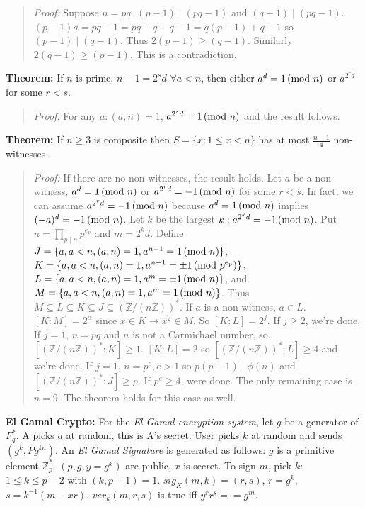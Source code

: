 \begin{quote}
\emph{Proof: } Suppose $n = pq$.  
$(p-1) \mid (pq - 1)$ and
$(q-1) \mid (pq - 1)$. $(p-1)a = pq -1 = pq - q + q-1 = q(p-1) + q-1$ so $(p-1) \mid (q-1)$.
Thus $2(p-1) \geq (q-1)$.  Similarly
$2(q-1) \geq (p-1)$.  This is a contradiction.
\end{quote}
{\bf Theorem: } If $n$ is prime, $n-1 = 2^sd$ $\forall a < n$, then either
$a^d =1 \thinspace \textnormal{(mod } n \textnormal{)}$ or $a^{2^rd}$ for some $r < s$.
\begin{quote}
\emph{Proof: }
For any $a: (a,n) = 1$, $a^{2^sd} = 1 \thinspace \textnormal{(mod } n \textnormal{)}$ and the result follows.
\end{quote}
{\bf Theorem: } If $n \ge 3$ is composite then $S= \{x: 1 \leq x < n \}$ has at most
${\frac {n-1} 4}$ non-witnesses.
\begin{quote}
\emph{Proof: }
If there are no non-witnesses, the result holds.  Let $a$ be a non-witness,
$a^{d} = 1 \thinspace \textnormal{(mod } n \textnormal{)}$ or $a^{2^rd} = -1 \thinspace \textnormal{(mod } n \textnormal{)}$ for some $r < s$.  In fact,
we can assume $a^{2^rd} = -1 \thinspace \textnormal{(mod } n \textnormal{)}$ because $a^{d} = 1 \thinspace \textnormal{(mod } n \textnormal{)}$ implies
$(-a)^{d} = -1 \thinspace \textnormal{(mod } n \textnormal{)}$.  Let $k$ be the largest $k: a^{2^kd} = -1 \thinspace \textnormal{(mod } n \textnormal{)}$.
Put $n = \prod_{p \mid n} p^{e_p}$ and $m = 2^kd$.  Define
$J= \{a, a < n, (a,n)=1, a^{n-1} = 1 \thinspace \textnormal{(mod } n \textnormal{)} \}$,
$K= \{a, a < n, (a,n)=1, a^{n-1} = \pm 1 \thinspace \textnormal{(mod } p^{e_p} \textnormal{)} \}$,
$L= \{a, a < n, (a,n)=1, a^{m} = \pm 1 \thinspace \textnormal{(mod } n \textnormal{)} \}$, and
$M= \{a, a < n, (a,n)=1, a^{m} = 1 \thinspace \textnormal{(mod } n \textnormal{)} \}$.
Thus $ M \subseteq L \subseteq K \subseteq J\subseteq ({\mathbb Z} / (n{\mathbb Z}))^*$.
If $a$ is a non-witness, $a \in L$.  $[K:M] = 2^{\alpha}$ since $x \in K \rightarrow x^2 \in M$.
So $[K:L] = 2^j$.  If $j \geq 2$, we're done.
If $j=1$, $n=pq$ and $n$ is not a Carmichael number, so $[({\mathbb Z} / (n{\mathbb Z}))^* : K] \geq 1$.
$[K:L] =2$ so $[({\mathbb Z} / (n{\mathbb Z}))^* : L] \geq 4$ and we're done.
If $j=1$, $n=p^e, e>1$ so $p(p-1) \mid \phi(n)$ and $[({\mathbb Z} / (n{\mathbb Z}))^* : J] \geq p$.
If $p^e \geq 4$, were done.  The only remaining case is $n = 9$.  The theorem holds for this case as well.
\end{quote}
{\bf El Gamal Crypto: }
For the \emph{El Gamal encryption system}, let $g$ be a generator of $F_{q}^*$.  
A picks $a$ at random,
this is A's secret.  User picks $k$ at random and sends $(g^{k}, Pg^{ka})$.
An \emph{El Gamal Signature} is generated as follows: $g$ is a primitive element
${\mathbb Z}_{p}^{*}$. $(p, g , y=g^x )$ are public, $x$ is secret.  To sign
$m$, pick $k$: $1 \leq k \leq p-2$ with $(k, p-1)= 1$.
$sig_K (m, k) =(r, s)$, $r=g^k$, $s= k^{-1}(m-xr)$.
$ver_k (m, r, s)$ is true iff $y^{r}r^{s}==g^m$.
